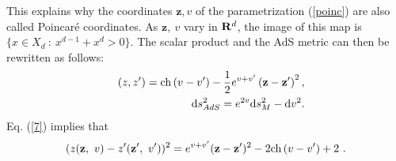 \documentclass[a4paper,a4paper]{article}
\newcommand{\zz}{{\mathbf{z}}}
\def\bR{{\bf R}}
\def\ch{{\rm ch\,}}
\begin{document}
This explains why  the coordinates $\zz,v$ of the parametrization (\ref{poinc})
are  also called Poincar\'e coordinates. As $\zz,\ v$ vary in $\bR^d$, the
image of this map is $\{x \in X_d\ :\ x^{d-1} +x^d >0\}$. The scalar product
and the AdS metric can then be rewritten as follows:
\begin{eqnarray}
&& (z,z') = \ch( {v}- {v} ')  - \frac 12 e^{ {v}+ {v}'}
\left(\zz-\zz'\right)^2,
\label{7}\\
&& {\mathrm d}s^2_{AdS} = e^{2 {v}} {\mathrm d}s^2_{{M}}-{\mathrm d} {v}^2.
\label{metric1}
\end{eqnarray}
 Eq. (\ref{7}) implies that
\begin{equation}
(z({\zz},\ v) - z'({\zz'},\ v'))^2 = e^{v+v'}(\zz-\zz')^2
- 2\ch(v-v') +2\ .
\label{lll}
\end{equation}
\end{document}
